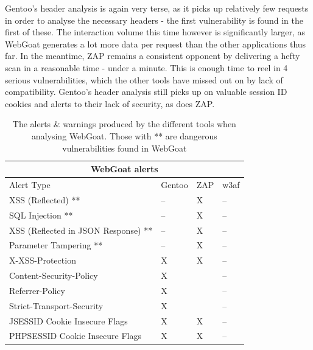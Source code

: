 Gentoo's header analysis is again very terse, as it picks up relatively few requests in order to analyse the necessary headers - the first vulnerability is found in the first of these. The interaction volume this time however is significantly larger, as WebGoat generates a lot more data per request than the other applications thus far. In the meantime, ZAP remains a consistent opponent by delivering a hefty scan in a reasonable time - under a minute. This is enough time to reel in 4 serious vulnerabilities, which the other tools have missed out on by lack of compatibility. Gentoo's header analysis still picks up on valuable session ID cookies and alerts to their lack of security, as does ZAP. 

\begin{table}[h]
	
	{
		
		\captionsetup{justification=centering}
		
		\caption{The alerts \& warnings produced by the different tools when analysing WebGoat. Those with ** are dangerous vulnerabilities found in WebGoat}
		\label{table:webgoat_alerts}
		\begin{tabular}{ |p{7cm}|>{\centering\arraybackslash}m{2cm} |>{\centering\arraybackslash}m{2cm} |>{\centering\arraybackslash}m{2cm}| }
			\hline
			\multicolumn{4}{|c|}{\textbf{WebGoat alerts}} \\ [0.5ex]
			\hline \hline 
			Alert Type & Gentoo & ZAP & w3af \\
			\hline
			XSS (Reflected) ** & -- & X & --\\	
			SQL Injection **& -- & X & --\\
			XSS (Reflected in JSON Response) ** & -- & X & -- \\
			Parameter Tampering **& -- & X & --\\
			X-XSS-Protection & X & X & --\\
			Content-Security-Policy & X & &-- \\
			Referrer-Policy & X & & --\\
			Strict-Transport-Security & X  & & --\\
			JSESSID Cookie Insecure Flags & X & X & -- \\
			PHPSESSID Cookie Insecure Flags & X & X & -- \\
			\hline
		\end{tabular}
	} \\
\end{table}


